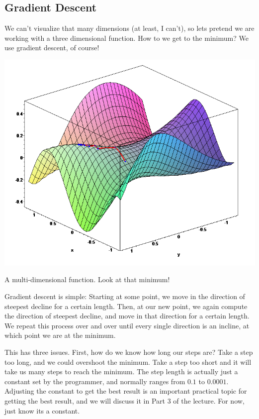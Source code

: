 \documentclass{article}
\begin{document}
\subsection{Gradient Descent}
We can't visualize that many dimensions (at least, I can't), so lets pretend we are working with a three dimensional function. How to we get to the minimum? We use gradient descent, of course!
\begin{center}
\includegraphics[scale=0.3]{gd}

A multi-dimensional function. Look at that minimum!

\end{center}

Gradient descent is simple: Starting at some point, we move in the direction of steepest decline for a certain length. Then, at our new point, we again compute the direction of steepest decline, and move in that direction for a certain length. We repeat this process over and over until every single direction is an incline, at which point we are at the minimum.

This has three issues. First, how do we know how long our steps are? Take a step too long, and we could overshoot the minimum. Take a step too short and it will take us many steps to reach the minimum. The step length is actually just a constant set by the programmer, and normally ranges from $0.1$ to $0.0001$. Adjusting the constant to get the best result is an important practical topic for getting the best result, and we will discuss it in Part 3 of the lecture. For now, just know its a constant.
\end{document}
